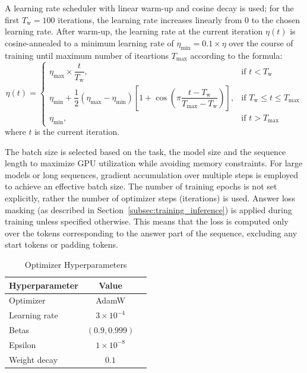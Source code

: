 A learning rate scheduler with linear warm-up and cosine decay is used; for the first $T_{\text{w}} = 100$ iterations, the learning rate increases linearly from $0$ to the chosen learning rate. After warm-up, the learning rate at the current iteration $\eta(t)$ is cosine-annealed to a minimum learning rate of $\eta_{\text{min}} = 0.1 \times \eta$ over the course of training until maximum number of iteartions $T_{\text{max}}$ according to the formula:
\[
  \eta(t) =
  \begin{cases}
    \eta_{\text{max}} \times \dfrac{t}{T_{\text{w}}},                                                                                                                          & \text{if } t < T_{\text{w}}                        \\
    \eta_{\text{min}} + \dfrac{1}{2} (\eta_{\text{max}} - \eta_{\text{min}}) \left[1 + \cos\left( \pi \dfrac{t - T_{\text{w}}}{T_{\text{max}} - T_{\text{w}}} \right) \right], & \text{if } T_{\text{w}} \leq t \leq T_{\text{max}} \\
    \eta_{\text{min}},                                                                                                                                                         & \text{if } t > T_{\text{max}}
  \end{cases}
\]
where $t$ is the current iteration.

The batch size is selected based on the task, the model size and the sequence length to maximize GPU utilization while avoiding memory constraints. For large models or long sequences, gradient accumulation over multiple steps is employed to achieve an effective batch size. The number of training epochs is not set explicitly, rather the number of optimizer steps (iterations) is used. Answer loss masking (as described in Section~\ref{subsec:training_inference}) is applied during training unless specified otherwise. This means that the loss is computed only over the tokens corresponding to the answer part of the sequence, excluding any start tokens or padding tokens.

\begin{table}[h]
  \centering
  \caption{Optimizer Hyperparameters}
  \label{tab:optimizer_hyperparameters}
  \begin{tabular}{lcc}
    \toprule
    Hyperparameter & Value              \\
    \midrule
    Optimizer      & AdamW              \\
    Learning rate  & $3 \times 10^{-4}$ \\
    Betas          & $(0.9, 0.999)$     \\
    Epsilon        & $1 \times 10^{-8}$ \\
    Weight decay   & $0.1$              \\
    \bottomrule
  \end{tabular}
\end{table}


